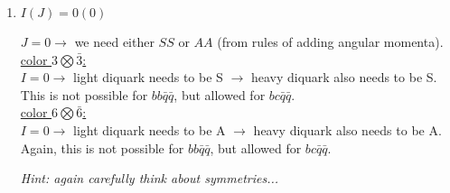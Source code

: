 \begin{enumerate}
	\item $I(J) = 0(0)$
	      
	      \begin{solution}
		      $J=0 \rightarrow$ we need either $SS$ or $AA$ (from rules of adding angular momenta).\\ 
		      \underline{color $3 \bigotimes \bar{3}$:}\\
		      $I=0 \rightarrow$ light diquark needs to be S $\rightarrow$ heavy diquark also needs to be S. This is not possible
		      for $bb\bar{q}\bar{q}$, but allowed for $bc\bar{q}\bar{q}$.\\
		      \underline{color $6 \bigotimes \bar{6}$:}\\
		      $I=0 \rightarrow$ light diquark needs to be A $\rightarrow$ heavy diquark also needs to be A. Again, this is not possible for $bb\bar{q}\bar{q}$, but allowed for $bc\bar{q}\bar{q}$.		
	      \end{solution}
	      
	      {\em Hint: again carefully think about symmetries...}
	      
	      
	      
\end{enumerate}